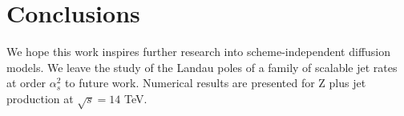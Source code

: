 \section{Conclusions}\label{sec:conclusions}

We hope this work inspires further research into scheme-independent
diffusion models. We leave the study of the Landau poles of a family of
scalable jet rates at order $\alpha_s^2$ to future work. Numerical
results are presented for Z plus jet production at $\sqrt{s} = 14$ TeV.

